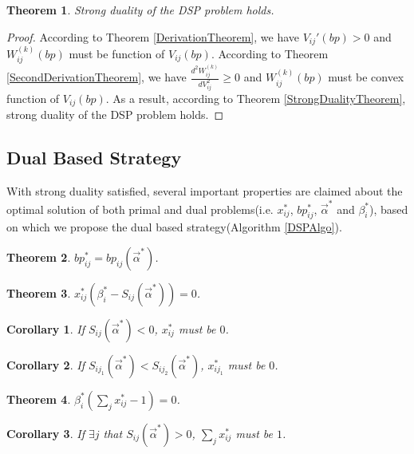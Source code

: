 \documentclass{article}
\newtheorem{theorem}{Theorem}[section]
\newtheorem{corollary}{Corollary}[theorem]
\newcommand{\sx}{x_{ij}}
\newcommand{\sbp}{bp_{ij}}
\newcommand{\sV}{V_{ij}}
\newcommand{\sW}{W_{ij}^{(k)}}
\newcommand{\sbeta}{\beta_i}
\newcommand{\sS}{S_{ij}}
\newcommand{\valpha}{\vec{\alpha}}
\begin{document}
\begin{theorem} \label{DSPStrongDualityTheorem}
Strong duality of the DSP problem holds.
\end{theorem}

\begin{proof}
According to Theorem \ref{DerivationTheorem}, we have $\sV'(bp)>0$ and $\sW(bp)$ must be function of $\sV(bp)$.
According to Theorem \ref{SecondDerivationTheorem}, we have $\frac{d^2\sW}{d\sV^2} \ge 0$ and $\sW(bp)$ must be convex function of $\sV(bp)$.
As a result, according to Theorem \ref{StrongDualityTheorem}, strong duality of the DSP problem holds.
\end{proof}

\subsection{Dual Based Strategy} \label{DSPDualBasedStrategy}

With strong duality satisfied, several important properties
    are claimed about the optimal solution of both primal and dual problems(i.e. $\sx^*$, $\sbp^*$, $\valpha^*$ and $\sbeta^*$),
    based on which we propose the dual based strategy(Algorithm \ref{DSPAlgo}).

\begin{theorem}
$\sbp^* = \sbp(\valpha^*)$.
\end{theorem}

\begin{theorem}
$\sx^*(\sbeta^* - \sS(\valpha^*)) = 0$.
\end{theorem}

\begin{corollary}
If $\sS(\valpha^*) < 0$, $\sx^*$ must be $0$.
\end{corollary}

\begin{corollary}
If $S_{ij_1}(\valpha^*) < S_{ij_2}(\valpha^*)$, $x_{ij_1}^*$ must be $0$.
\end{corollary}

\begin{theorem}
$\sbeta^*(\sum\limits_j \sx^* - 1) = 0$.
\end{theorem}

\begin{corollary}
If $\exists j$ that $\sS(\valpha^*) > 0$, $\sum\limits_j \sx^*$ must be $1$.
\end{corollary}
\end{document}
